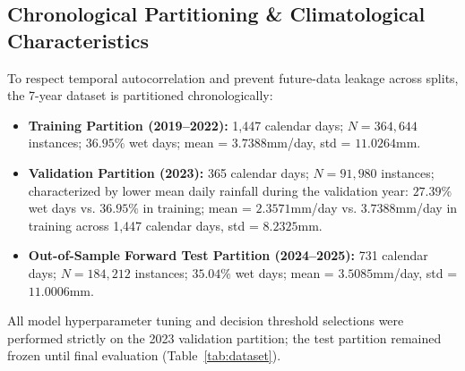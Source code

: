\documentclass[pdflatex,sn-mathphys,Numbered]{sn-jnl}
\begin{document}
\subsection{Chronological Partitioning \& Climatological Characteristics}
To respect temporal autocorrelation and prevent future-data leakage across splits, the 7-year dataset is partitioned chronologically:
\begin{itemize}
    \item \textbf{Training Partition (2019--2022):} 1,447 calendar days; $N = 364,644$ instances; $36.95\%$ wet days; mean = $3.7388$\;mm/day, std = $11.0264$\;mm.
    \item \textbf{Validation Partition (2023):} 365 calendar days; $N = 91,980$ instances; characterized by lower mean daily rainfall during the validation year: $27.39\%$ wet days vs. $36.95\%$ in training; mean = $2.3571$\;mm/day vs. $3.7388$\;mm/day in training across 1,447 calendar days, std = $8.2325$\;mm.
    \item \textbf{Out-of-Sample Forward Test Partition (2024--2025):} 731 calendar days; $N = 184,212$ instances; $35.04\%$ wet days; mean = $3.5085$\;mm/day, std = $11.0006$\;mm.
\end{itemize}
All model hyperparameter tuning and decision threshold selections were performed strictly on the 2023 validation partition; the test partition remained frozen until final evaluation (Table~\ref{tab:dataset}).
\end{document}

